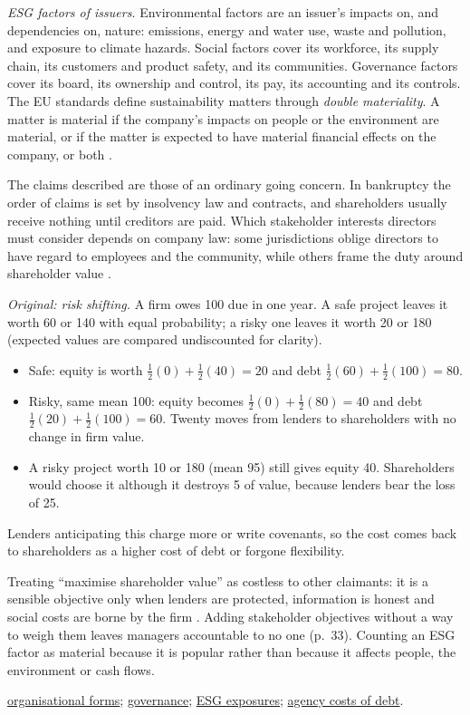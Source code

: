 \begin{qfdefinition}
\emph{ESG factors of issuers.} Environmental factors are an issuer's impacts on, and dependencies on, nature: emissions, energy and water use, waste and pollution, and exposure to climate hazards. Social factors cover its workforce, its supply chain, its customers and product safety, and its communities. Governance factors cover its board, its ownership and control, its pay, its accounting and its controls. The EU standards define sustainability matters through \emph{double materiality}. A matter is material if the company's impacts on people or the environment are material, or if the matter is expected to have material financial effects on the company, or both \citep[Annex, ESRS~1 paras.~22--25]{eu-2026-1563-esrs}.

 The claims described are those of an ordinary going concern. In bankruptcy the order of claims is set by insolvency law and contracts, and shareholders usually receive nothing until creditors are paid. Which stakeholder interests directors must consider depends on company law: some jurisdictions oblige directors to have regard to employees and the community, while others frame the duty around shareholder value \citep[pp.~33--35]{applied-corporate-finance-2014}.

 \emph{Original: risk shifting.} A firm owes 100 due in one year. A safe project leaves it worth 60 or 140 with equal probability; a risky one leaves it worth 20 or 180 (expected values are compared undiscounted for clarity).
\begin{itemize}
\item Safe: equity is worth $\frac12(0)+\frac12(40)=20$ and debt $\frac12(60)+\frac12(100)=80$.
\item Risky, same mean 100: equity becomes $\frac12(0)+\frac12(80)=40$ and debt $\frac12(20)+\frac12(100)=60$. Twenty moves from lenders to shareholders with no change in firm value.
\item A risky project worth 10 or 180 (mean 95) still gives equity 40. Shareholders would choose it although it destroys 5 of value, because lenders bear the loss of 25.
\end{itemize}
Lenders anticipating this charge more or write covenants, so the cost comes back to shareholders as a higher cost of debt or forgone flexibility.

 Treating ``maximise shareholder value'' as costless to other claimants: it is a sensible objective only when lenders are protected, information is honest and social costs are borne by the firm \citep[pp.~13--14]{applied-corporate-finance-2014}. Adding stakeholder objectives without a way to weigh them leaves managers accountable to no one (p.~33). Counting an ESG factor as material because it is popular rather than because it affects people, the environment or cash flows.

 \hyperref[def:organisational-forms-issuers]{organisational forms}; \hyperref[meth:corporate-governance-evaluation]{governance}; \hyperref[meth:esg-exposure-evaluation]{ESG exposures}; \hyperref[mod:capital-structure-theory]{agency costs of debt}.

\end{qfdefinition}

